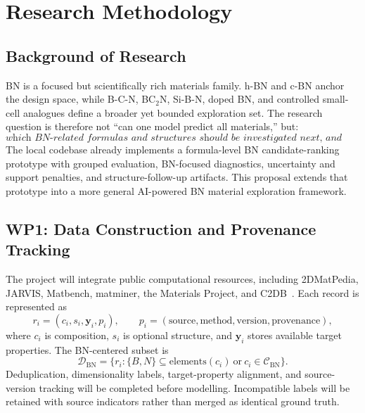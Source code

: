 \documentclass[10pt,a4paper]{article}
\begin{document}
\section{Research Methodology}
\subsection{Background of Research}
BN is a focused but scientifically rich materials family. h-BN and c-BN anchor the design space, while B-C-N, BC$_2$N, Si-B-N, doped BN, and controlled small-cell analogues define a broader yet bounded exploration set. The research question is therefore not ``can one model predict all materials,'' but:
\[
  \textit{which BN-related formulas and structures should be investigated next, and with what uncertainty?}
\]
The local codebase already implements a formula-level BN candidate-ranking prototype with grouped evaluation, BN-focused diagnostics, uncertainty and support penalties, and structure-follow-up artifacts. This proposal extends that prototype into a more general AI-powered BN material exploration framework.

\subsection{WP1: Data Construction and Provenance Tracking}
The project will integrate public computational resources, including 2DMatPedia, JARVIS, Matbench, matminer, the Materials Project, and C2DB~\cite{zhou2019_2dmatpedia,choudhary2020_jarvis,dunn2020_matbench,ward2018_matminer,jain2013_mp,haastrup2018_c2db}. Each record is represented as
\[
  r_i=(c_i,s_i,\mathbf{y}_i,p_i),\qquad
  p_i=(\mathrm{source},\mathrm{method},\mathrm{version},\mathrm{provenance}),
\]
where $c_i$ is composition, $s_i$ is optional structure, and $\mathbf{y}_i$ stores available target properties. The BN-centered subset is
\[
  \mathcal{D}_{\mathrm{BN}}=\{r_i:\{B,N\}\subseteq\mathrm{elements}(c_i)\ \mathrm{or}\ c_i\in\mathcal{C}_{\mathrm{BN}}\}.
\]
Deduplication, dimensionality labels, target-property alignment, and source-version tracking will be completed before modelling. Incompatible labels will be retained with source indicators rather than merged as identical ground truth.
\end{document}
